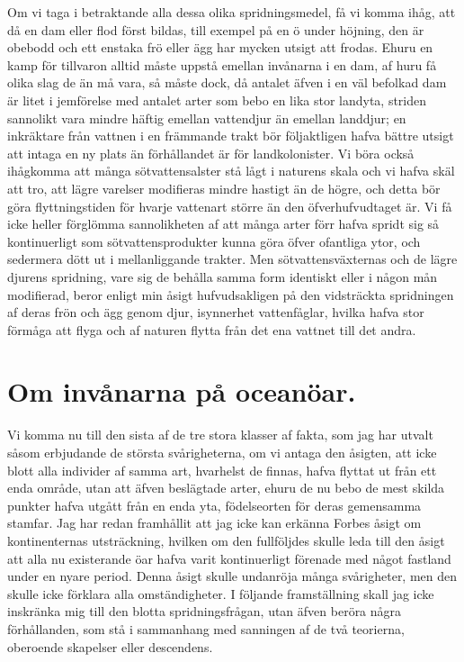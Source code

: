 Om vi taga i betraktande alla dessa olika spridningsmedel, få vi komma ihåg, att då en dam eller flod först bildas, till exempel på en ö under höjning, den är obebodd och ett enstaka frö eller ägg har mycken utsigt att frodas. Ehuru en kamp för tillvaron alltid måste uppstå emellan invånarna i en dam, af huru få olika slag de än må vara, så måste dock, då antalet äfven i en väl befolkad dam är litet i jemförelse med antalet arter som bebo en lika stor landyta, striden sannolikt vara mindre häftig emellan vattendjur än emellan landdjur; en inkräktare från vattnen i en främmande trakt bör följaktligen hafva bättre utsigt att intaga en ny plats än förhållandet är för landkolonister. Vi böra också ihågkomma att många sötvattensalster stå lågt i naturens skala och vi hafva skäl att tro, att lägre varelser modifieras mindre hastigt än de högre, och detta bör göra flyttningstiden för hvarje vattenart större än den öfverhufvudtaget är. Vi få icke heller förglömma sannolikheten af att många arter förr hafva spridt sig så kontinuerligt som sötvattensprodukter kunna göra öfver ofantliga ytor, och sedermera dött ut i mellanliggande trakter. Men sötvattensväxternas och de lägre djurens spridning, vare sig de behålla samma form identiskt eller i någon mån modifierad, beror enligt min åsigt hufvudsakligen på den vidsträckta spridningen af deras frön och ägg genom djur, isynnerhet vattenfåglar, hvilka hafva stor förmåga att flyga och af naturen flytta från det ena vattnet till det andra.

\section{Om invånarna på oceanöar.}

Vi komma nu till den sista af de tre stora klasser af fakta, som jag har utvalt såsom erbjudande de största svårigheterna, om vi antaga den åsigten, att icke blott alla individer af samma art, hvarhelst de finnas, hafva flyttat ut från ett enda område, utan att äfven beslägtade arter, ehuru de nu bebo de mest skilda punkter hafva utgått från en enda yta, födelseorten för deras gemensamma stamfar. Jag har redan framhållit att jag icke kan erkänna Forbes åsigt om kontinenternas utsträckning, hvilken om den fullföljdes skulle leda till den åsigt att alla nu existerande öar hafva varit kontinuerligt förenade med något fastland under en nyare period. Denna åsigt skulle undanröja många svårigheter, men den skulle icke förklara alla omständigheter. I följande framställning skall jag icke inskränka mig till den blotta spridningsfrågan, utan äfven beröra några förhållanden, som stå i sammanhang med sanningen af de två teorierna, oberoende skapelser eller descendens.

